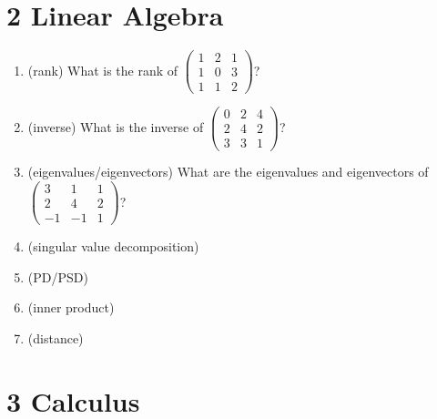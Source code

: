 \documentclass[12pt]{article}
\theoremstyle{definition}
\begin{document}
\section*{2 Linear Algebra}
\begin{enumerate}
    \item (rank)
    What is the rank of 
    $
    \begin{pmatrix}
        1 & 2 & 1\\
        1 & 0 & 3\\
        1 & 1 & 2
      \end{pmatrix}
    $?
    \item (inverse)
    What is the inverse of 
    $
    \begin{pmatrix}
        0 & 2 & 4\\
        2 & 4 & 2\\
        3 & 3 & 1
      \end{pmatrix}
    $?
    \item (eigenvalues/eigenvectors)
    What are the eigenvalues and eigenvectors of
    $
    \begin{pmatrix}
        3 & 1 & 1\\
        2 & 4 & 2\\
        -1 & -1 & 1
      \end{pmatrix}
    $?
    \item (singular value decomposition)
    \item (PD/PSD)
    \item (inner product)
    \item (distance)
\end{enumerate}
\section*{3 Calculus}
\end{document}
